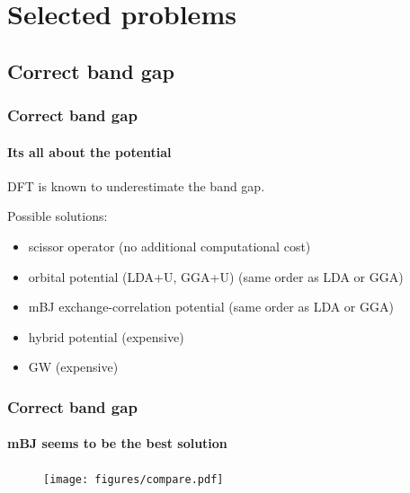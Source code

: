 \documentclass{beamer}
\begin{document}
\section{Selected problems}
\subsection{Correct band gap}

\begin{frame}
    \frametitle{Correct band gap}
    \framesubtitle{Its all about the potential}

	DFT is known to underestimate the band gap.

	Possible solutions:
	\begin{itemize}
	\item scissor operator (no additional computational cost)
	\item orbital potential (LDA+U, GGA+U) (same order as LDA or GGA)
	\item mBJ exchange-correlation potential (same order as LDA or GGA)
	\item hybrid potential (expensive)
	\item GW (expensive)
	\end{itemize}
\end{frame}

\begin{frame}
    \frametitle{Correct band gap}
    \framesubtitle{mBJ seems to be the best solution}

    \begin{figure}
	\texttt{[image: figures/compare.pdf]}
	\end{figure}

\end{frame}
\end{document}
